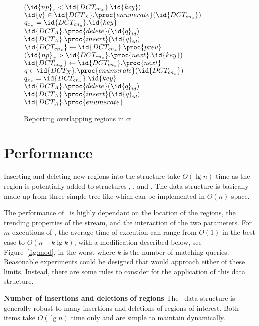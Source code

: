 \documentclass{sig-alternate}
\newcommand{\meth}{.}
\newcommand{\inC}[1]{{\id{DCT_{#1}}}}
\newcommand{\X}{{\inC{X}}}
\newcommand{\Y}{{\inC{Y}}}
\newcommand{\A}{{\inC{A}}}
\newcommand{\cnx}{{\inC{cn_x}}}
\newcommand{\cny}{{\inC{cn_y}}}
\begin{document}
\begin{figure}[htbp]
\begin{codebox}
\li \While $(\id{np}_x < \cnx \meth \id{key})$ \label{li:report-x-loop-begin}
\li   \Do
      $\id{q} \in \X \meth \proc{enumerate}(\cnx)$
\li       \Do
         \If $q_{x_n} = \cny \meth \id{key}$
\li            \Then
\li               $\A \meth \proc{delete}(\id{q}_{id})$
\li            \Else
\li               $\A \meth \proc{insert}(\id{q}_{id})$
            \End
         \End
       \End
\li     $\cnx \gets \cnx \meth \proc{prev}$
   \End
\li \While $(\id{np}_x > \cnx \meth \proc{next} \meth \id{key})$
\li   \Do
     $\cnx \gets \cnx \meth \proc{next}$
\li     {} $q \in \X \meth \proc{enumerate}(\cnx)$
\li       \Do
         \If $q_{x_x} = \cnx \meth \id{key}$
\li            \Then
\li               $\A \meth \proc{delete}(\id{q}_{id})$
\li            \Else
\li               $\A \meth \proc{insert}(\id{q}_{id})$
            \End
       \End
   \End \label{li:report-x-loop-end}
\li \Return $\A \meth \proc{enumerate}$ \label{li:report-return}
\End
\end{codebox}  
  \caption{Reporting overlapping regions in \ac{ct}}
  \label{fig:report}
\end{figure}


\section{Performance}
\label{sec:performance}

Inserting and deleting new regions into the structure take $O(\lg{n})$
time as the region is potentially added to structures \X, \Y, and \A.
The data structure is basically made up from three simple tree like
which can be implemented in $O(n)$ space.

The performance of \ is highly dependant on the
location of the regions, the trending properties of the stream, and
the interaction of the two parameters.  For $m$ executions of
, the average time of execution can range from
$O(1)$ in the best case to $O(n+k\lg{k})$, with a modification
described below, see Figure~\ref{fig:mod}, in the worst where $k$ is
the number of matching queries.  Reasonable experiments could be
designed that would approach either of these limits.  Instead, there
are some rules to consider for the application of this data structure.


{\bf Number of insertions and deletions of regions}
%
The \ data structure is generally robust to many insertions
and deletions of regions of interest.  Both items take $O(\lg{n})$
time only and are simple to maintain dynamically.
\end{document}
